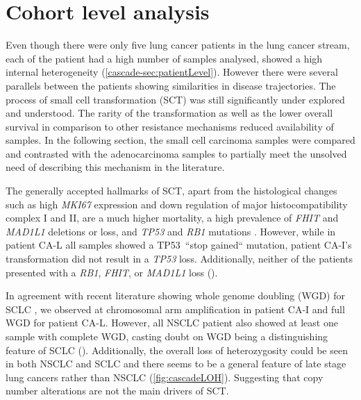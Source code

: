 

\section{Cohort level analysis}
\label{cascade-sec:cohortLevel}

Even though there were only five lung cancer patients in the lung cancer stream, each of the patient had a high number of samples analysed, showed a high internal heterogeneity (\autoref{cascade-sec:patientLevel}). However there were several parallels between the patients showing similarities in disease trajectories. The process of small cell transformation (SCT) was still significantly under explored and understood. The rarity of the transformation as well as the lower overall survival in comparison to other resistance mechanisms reduced availability of samples. In the following section, the small cell carcinoma samples were compared and contrasted with the adenocarcinoma samples to partially meet the unsolved need of describing this mechanism in the literature.

The generally accepted hallmarks of SCT, apart from the histological changes such as high \textit{MKI67} expression and down regulation of major histocompatibility complex I and II, are a much higher mortality, a high prevalence of \textit{FHIT} and \textit{MAD1L1} deletions or loss, and \textit{TP53} and \textit{RB1} mutations \cite{Meerbeeck2011,Raso2021}. However, while in patient CA-L all samples showed a TP53~``stop gained`` mutation, patient CA-I's transformation did not result in a \textit{TP53} loss. Additionally, neither of the patients presented with a \textit{RB1}, \textit{FHIT}, or \textit{MAD1L1} loss (). 

In agreement with recent literature showing whole genome doubling (WGD) for SCLC \cite{Zhou2021}, we observed at chromosomal arm amplification in patient CA-I and full WGD for patient CA-L. However, all NSCLC patient also showed at least one sample with complete WGD, casting doubt on WGD being a distinguishing feature of SCLC (). Additionally, the overall loss of heterozygosity could be seen in both NSCLC and SCLC and there seems to be a general feature of late stage lung cancers rather than NSCLC (\autoref{fig:cascadeLOH}). Suggesting that copy number alterations are not the main drivers of SCT.

